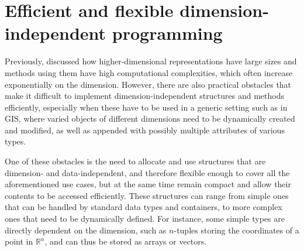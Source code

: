\section{Efficient and flexible dimension-independent programming}
\label{se:traits}

Previously,  discussed how higher-dimensional representations have large sizes and methods using them have high computational complexities, which often increase exponentially on the dimension.
However, there are also practical obstacles that make it difficult to implement dimension-independent structures and methods efficiently, especially when these have to be used in a generic setting such as in GIS, where varied objects of different dimensions need to be dynamically created and modified, as well as appended with possibly multiple attributes of various types.

One of these obstacles is the need to allocate and use structures that are dimension- and data-independent, and therefore flexible enough to cover all the aforementioned use cases, but at the same time remain compact and allow their contents to be accessed efficiently.
These structures can range from simple ones that can be handled by standard data types and containers, to more complex ones that need to be dynamically defined.
For instance, some simple types are directly dependent on the dimension, such as $n$-tuples storing the coordinates of a point in $\mathbb{R}^n$, and can thus be stored as arrays or vectors.

